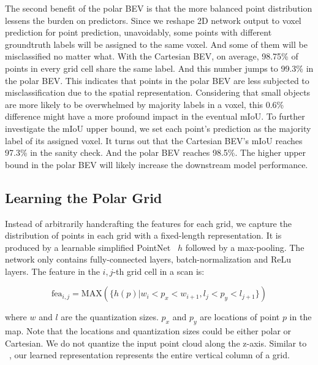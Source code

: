 \documentclass[10pt,twocolumn,letterpaper]{article}
\begin{document}
The second benefit of the polar BEV is that the more balanced point distribution lessens the burden on predictors. Since we reshape 2D network output to voxel prediction for point prediction, unavoidably, some points with different groundtruth labels will be assigned to the same voxel. And some of them will be misclassified no matter what. With the Cartesian BEV, on average, 98.75\% of points in every grid cell share the same label. And this number jumps to 99.3\% in the polar BEV. This indicates that points in the polar BEV are less subjected to misclassification due to the spatial representation. Considering that small objects are more likely to be overwhelmed by majority labels in a voxel, this 0.6\% difference might have a more profound impact in the eventual mIoU. To further investigate the mIoU upper bound, we set each point's prediction as the majority label of its assigned voxel. It turns out that the Cartesian BEV's mIoU reaches 97.3\% in the sanity check. And the polar BEV reaches 98.5\%. The higher upper bound in the polar BEV will likely increase the downstream model performance.
 
 \subsection{Learning the Polar Grid}

Instead of arbitrarily handcrafting the features for each grid, we capture the distribution of points in each grid with a fixed-length representation. It is produced by a learnable simplified PointNet~\cite{qi2017pointnet} $h$ followed by a max-pooling. The network only contains fully-connected layers, batch-normalization and ReLu layers. The feature in the $i,j$-th grid cell in a scan is:

\begin{equation}
    \textrm{fea}_{i,j} = \textrm{MAX}(\{h(p)| w_i<p_x<w_{i+1}, l_j<p_y<l_{j+1}\})
\end{equation}

\noindent where $w$ and $l$ are the quantization sizes. $p_x$ and $p_y$ are locations of point $p$ in the map. Note that the locations and quantization sizes could be either polar or Cartesian. We do not quantize the input point cloud along the z-axis. Similar to ~\cite{lang2019pointpillars}, our learned representation represents the entire vertical column of a grid.
\end{document}
